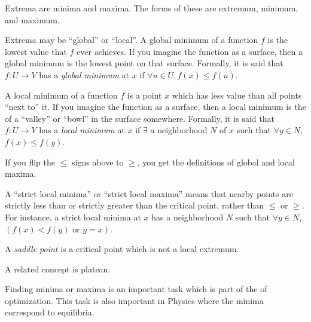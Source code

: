 \documentclass[12pt]{article}
\begin{document}
Extrema are minima and maxima. The  forms of these  are extremum, minimum, and maximum. 

Extrema may be ``global'' or ``local''. A global minimum of a function $f$ is the lowest value that $f$ ever achieves. If you imagine the function as a surface, then a global minimum is the lowest point on that surface. Formally, it is said that $f\colon U \to V$ has a \emph{global minimum} at $x$ if $\forall u \in U, f(x) \leq f(u)$. 

A local minimum of a function $f$ is a point $x$ which has less value than all points ``next to'' it. If you imagine the function as a surface, then a local minimum is the  of a ``valley'' or ``bowl'' in the surface somewhere. Formally, it is said that $f\colon U \to V$ has a \emph{local minimum} at $x$ if $\exists$ a neighborhood $N$ of $x$ such that $\forall y \in N$, $f(x) \leq f(y)$.

If you flip the $\leq$ signs above to $\geq$, you get the definitions of global and local maxima.

A ``strict local minima'' or ``strict local maxima'' means that nearby points are strictly less than or strictly greater than the critical point, rather than $\leq$ or $\geq$. For instance, a strict local minima at $x$ has a neighborhood $N$ such that $\forall y \in N$, $(f(x) < f(y) \textrm{ or } y = x)$.  

A \emph{saddle point} is a critical point which is not a local extremum. 

A related concept is  plateau.

Finding minima or maxima is an important task which is part of the  of optimization.
This task is also important in Physics where the minima correspond to equilibria.
\end{document}
